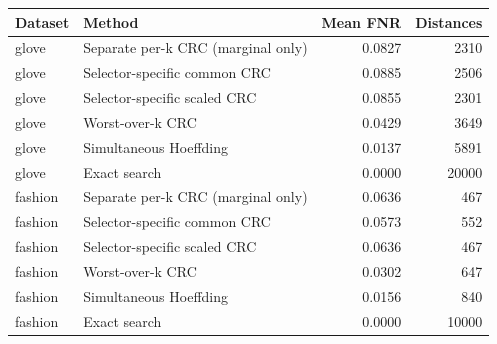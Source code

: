 \begin{tabular}{llrr}
\hline
Dataset & Method & Mean FNR & Distances \\
\hline
glove & Separate per-k CRC (marginal only) & 0.0827 & 2310 \\
glove & Selector-specific common CRC & 0.0885 & 2506 \\
glove & Selector-specific scaled CRC & 0.0855 & 2301 \\
glove & Worst-over-k CRC & 0.0429 & 3649 \\
glove & Simultaneous Hoeffding & 0.0137 & 5891 \\
glove & Exact search & 0.0000 & 20000 \\
fashion & Separate per-k CRC (marginal only) & 0.0636 & 467 \\
fashion & Selector-specific common CRC & 0.0573 & 552 \\
fashion & Selector-specific scaled CRC & 0.0636 & 467 \\
fashion & Worst-over-k CRC & 0.0302 & 647 \\
fashion & Simultaneous Hoeffding & 0.0156 & 840 \\
fashion & Exact search & 0.0000 & 10000 \\
\hline
\end{tabular}
